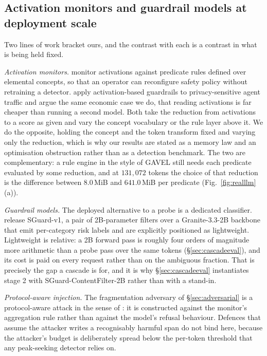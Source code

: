 \documentclass[10pt]{article}
\theoremstyle{plain}
\theoremstyle{definition}
\theoremstyle{remark}
\begin{document}
\subsection{Activation monitors and guardrail models at deployment scale}
\label{sec:guardrails}

Two lines of work bracket ours, and the contrast with each is a contrast in what is being
held fixed.

\emph{Activation monitors.} \citet{rozenfeld2026gavel} monitor activations against
predicate rules defined over elemental concepts, so that an operator can reconfigure
safety policy without retraining a detector. \citet{das2026neurofilter} apply
activation-based guardrails to privacy-sensitive agent traffic and argue the same
economic case we do, that reading activations is far cheaper than running a second model.
Both take the reduction from activations to a score as given and vary the concept
vocabulary or the rule layer above it. We do the opposite, holding the concept and the
token transform fixed and varying only the reduction, which is why our results are stated
as a memory law and an optimisation obstruction rather than as a detection benchmark. The
two are complementary: a rule engine in the style of GAVEL still needs each predicate
evaluated by some reduction, and at $131{,}072$ tokens the choice of that reduction is the
difference between $8.0$\,MiB and $641.0$\,MiB per predicate
(Fig.~\ref{fig:realllm}(a)).

\emph{Guardrail models.} The deployed alternative to a probe is a dedicated classifier.
\citet{lee2025sguard} release SGuard-v1, a pair of 2B-parameter filters over a
Granite-3.3-2B backbone that emit per-category risk labels and are explicitly positioned
as lightweight. Lightweight is relative: a 2B forward pass is roughly four orders of
magnitude more arithmetic than a probe pass over the same tokens
(\S\ref{sec:cascadeeval}), and its cost is paid on every request rather than on the
ambiguous fraction. That is precisely the gap a cascade is for, and it is why
\S\ref{sec:cascadeeval} instantiates stage 2 with SGuard-ContentFilter-2B rather than with
a stand-in.

\emph{Protocol-aware injection.} The fragmentation adversary of \S\ref{sec:adversarial}
is a protocol-aware attack in the sense of \citet{gardnerchallis2026untrusted}: it is
constructed against the monitor's aggregation rule rather than against the model's
refusal behaviour. Defences that assume the attacker writes a recognisably harmful span
do not bind here, because the attacker's budget is deliberately spread below the
per-token threshold that any peak-seeking detector relies on.
\end{document}
